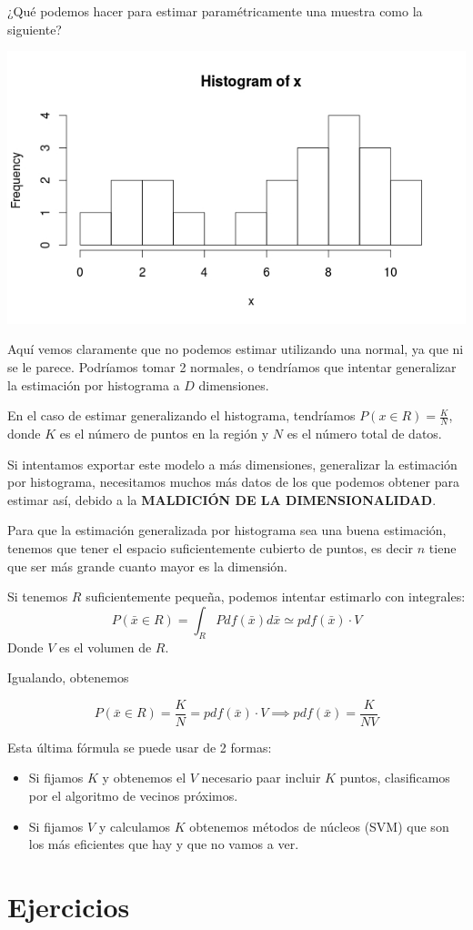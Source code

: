 \documentclass{apuntes}
\begin{document}
 ¿Qué podemos hacer para estimar paramétricamente una muestra como la siguiente?

\begin{center}
 \includegraphics[scale=0.4]{img/histogramaCenas.jpeg}
\end{center}
Aquí vemos claramente que no podemos estimar utilizando una normal, ya que ni se le parece. Podríamos tomar 2 normales, o tendríamos que intentar generalizar la estimación por histograma a $D$ dimensiones.


En el caso de estimar generalizando el histograma, tendríamos $P(x∈R) = \frac{K}{N}$, donde $K$ es el número de puntos en la región y $N$ es el número total de datos.


Si intentamos exportar este modelo a más dimensiones, generalizar la estimación por histograma, necesitamos muchos más datos de los que podemos obtener para estimar así, debido a la \textbf{MALDICIÓN DE LA DIMENSIONALIDAD}. 

Para que la estimación generalizada por histograma sea una buena estimación, tenemos que tener el espacio suficientemente cubierto de puntos, es decir $n$ tiene que ser más grande cuanto mayor es la dimensión.

Si tenemos $R$ suficientemente pequeña, podemos intentar estimarlo con integrales: \[P(\bar{x}∈R) = \int_R Pdf(\bar{x})d\bar{x} \simeq pdf(\bar{x})·V\]
Donde $V$ es el volumen de $R$.

Igualando, obtenemos 

\[
P(\bar{x}∈R) = \frac{K}{N} = pdf(\bar{x})·V \implies pdf(\bar{x}) = \frac{K}{NV}
\]

Esta última fórmula se puede usar de 2 formas:

\begin{itemize}
	\item Si fijamos $K$ y obtenemos el $V$ necesario paar incluir $K$ puntos, clasificamos por el algoritmo de vecinos próximos.
	\item Si fijamos $V$ y calculamos $K$ obtenemos métodos de núcleos (SVM) que son los más eficientes que hay y que no vamos a ver.
\end{itemize}




\appendix


\chapter{Ejercicios}

\printindex
\end{document}
